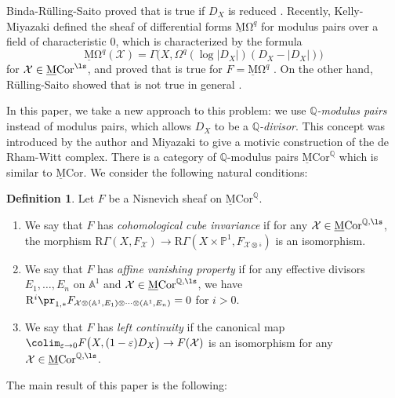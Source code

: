 \documentclass{amsart}
\theoremstyle{plain}
\theoremstyle{definition}
\newtheorem{definition}[theorem]{Definition}
\theoremstyle{remark}
\numberwithin{equation}{section}
\def\bcube{{\overline{\square}}}
\def\RGamma{\mathrm{R}\Gamma}
\def\MCor{\mathrm{\underline{M}Cor}}
\def\MOmega{\mathrm{\underline{M}\Omega}}
\begin{document}
Binda-R\"ulling-Saito proved that  is true if $D_X$ is reduced \cite[Theorem 2.12]{BRS}.
Recently, Kelly-Miyazaki \cite{KellyMiyazaki_Hodge1,KellyMiyazaki_Hodge2} defined the sheaf of differential forms $\MOmega^q$ for modulus pairs over a field of characteristic $0$, which is characterized by the formula
$$
    \MOmega^q(\mathcal{X})=\Gamma\bigl(X,\Omega^q(\log |D_X|)(D_X-|D_X|)\bigr)
$$
for $\mathcal{X}\in \MCor^\ls$, and proved that  is true for $F=\MOmega^q$ \cite[Theorem 6.1]{KellyMiyazaki_Hodge2}.
On the other hand, R\"ulling-Saito showed that  is not true in general \cite[Section 6.9]{RSram3}.

In this paper, we take a new approach to this problem: we use \emph{$\mathbb{Q}$-modulus pairs} instead of modulus pairs, which allows $D_X$ to be a \emph{$\mathbb{Q}$-divisor}.
This concept was introduced by the author and Miyazaki \cite{Koizumi-Miyazaki} to give a motivic construction of the de Rham-Witt complex.
There is a category of $\mathbb{Q}$-modulus pairs $\MCor^\mathbb{Q}$ which is similar to $\MCor$.
We consider the following natural conditions:

\begin{definition}
    Let $F$ be a Nisnevich sheaf on $\MCor^\mathbb{Q}$.
    \begin{enumerate}
        \item We say that $F$ has \emph{cohomological cube invariance} if for any $\mathcal{X}\in \MCor^{\mathbb{Q},\ls}$, the morphism $\RGamma(X,F_\mathcal{X})\to \RGamma(X\times\mathbb{P}^1,F_{\mathcal{X}\otimes \bcube})$ is an isomorphism.
        \item We say that $F$ has \emph{affine vanishing property} if for any effective divisors $E_1,\dots,E_n$ on $\mathbb{A}^1$ and $\mathcal{X}\in \MCor^{\mathbb{Q},\ls}$, we have $\mathrm{R}^i\pr_{1,*}F_{\mathcal{X}\otimes(\mathbb{A}^1,E_1)\otimes\cdots\otimes(\mathbb{A}^1,E_n)}=0$ for $i>0$.
        \item We say that $F$ has \emph{left continuity} if the canonical map
    $\colim_{\varepsilon \to 0} F\bigl(X,(1-\varepsilon)D_X\bigr)\to F(\mathcal{X})$
    is an isomorphism for any $\mathcal{X}\in \MCor^{\mathbb{Q},\ls}$.
    \end{enumerate}
\end{definition}

The main result of this paper is the following:
\end{document}
